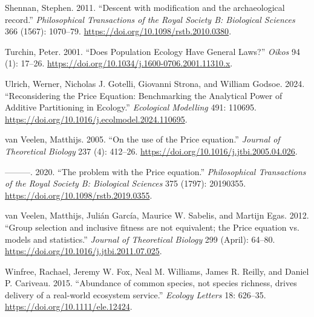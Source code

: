 \documentclass[
]{article}
\newlength{\cslhangindent}
\newlength{\cslentryspacingunit} %
\newenvironment{CSLReferences}[2] %
 {%
  \setlength{\parindent}{0pt}
  \ifodd #1
  \let\oldpar\par
  \def\par{\hangindent=\cslhangindent\oldpar}
  \fi
  \setlength{\parskip}{#2\cslentryspacingunit}
 }%
 {}
\begin{document}
\begin{CSLReferences}{1}{0}
\leavevmode{}%
Shennan, Stephen. 2011. {``{Descent with modification and the
archaeological record}.''} \emph{Philosophical Transactions of the Royal
Society B: Biological Sciences} 366 (1567): 1070--79.
\url{https://doi.org/10.1098/rstb.2010.0380}.

\leavevmode{}%
Turchin, Peter. 2001. {``Does Population Ecology Have General Laws?''}
\emph{Oikos} 94 (1): 17--26.
\url{https://doi.org/10.1034/j.1600-0706.2001.11310.x}.

\leavevmode{}%
Ulrich, Werner, Nicholas J. Gotelli, Giovanni Strona, and William
Godsoe. 2024. {``Reconsidering the Price Equation: Benchmarking the
Analytical Power of Additive Partitioning in Ecology.''}
\emph{Ecological Modelling} 491: 110695.
\url{https://doi.org/10.1016/j.ecolmodel.2024.110695}.

\leavevmode{}%
van Veelen, Matthijs. 2005. {``{On the use of the Price equation}.''}
\emph{Journal of Theoretical Biology} 237 (4): 412--26.
\url{https://doi.org/10.1016/j.jtbi.2005.04.026}.

\leavevmode{}%
---------. 2020. {``{The problem with the Price equation}.''}
\emph{Philosophical Transactions of the Royal Society B: Biological
Sciences} 375 (1797): 20190355.
\url{https://doi.org/10.1098/rstb.2019.0355}.

\leavevmode{}%
van Veelen, Matthijs, Julián García, Maurice W. Sabelis, and Martijn
Egas. 2012. {``{Group selection and inclusive fitness are not
equivalent; the Price equation vs. models and statistics}.''}
\emph{Journal of Theoretical Biology} 299 (April): 64--80.
\url{https://doi.org/10.1016/j.jtbi.2011.07.025}.

\leavevmode{}%
Winfree, Rachael, Jeremy W. Fox, Neal M. Williams, James R. Reilly, and
Daniel P. Cariveau. 2015. {``{Abundance of common species, not species
richness, drives delivery of a real-world ecosystem service}.''}
\emph{Ecology Letters} 18: 626--35.
\url{https://doi.org/10.1111/ele.12424}.

\end{CSLReferences}
\end{document}
